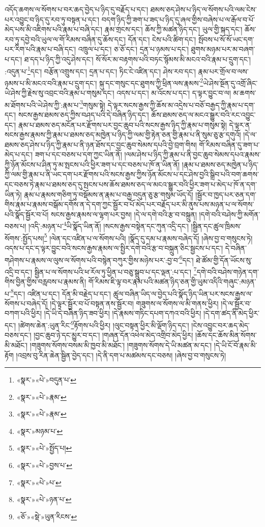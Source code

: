 འདོད་ཆགས་ལ་སོགས་པ་བར་ཆད་བྱེད་པ་ཉིད་དུ་བརྗོད་པ་དང་། ཐམས་ཅད་ཤེས་པ་ཉིད་ལ་སོགས་པའི་ལམ་ངེས་པར་འབྱུང་བ་ཉིད་དུ་རབ་ཏུ་བསྟན་པ་དང་། བདག་ཉིད་ཀྱི་ཟག་པ་ཟད་པ་ཉིད་དུ་ཞལ་གྱིས་བཞེས་པ་ལ་རྒོལ་བ་པོ་མེད་པས་མི་འཇིགས་པའི་རྣམ་པ་བཞི་དང་། རྣམ་གྲངས་དང་། ཆོས་ཀྱི་མཚན་ཉིད་དང་། ཡུལ་གྱི་སྐད་དང་། ཆོས་རབ་ཏུ་དབྱེ་བའི་ཡུལ་ལ་གོ་རིམས་བཞིན་དུ་ཆོས་དང་། དོན་དང་། ངེས་པའི་ཚིག་དང་། སྤོབས་པ་སོ་སོ་ཡང་དག་པར་རིག་པའི་རྣམ་པ་བཞི་དང་། འཁྲུལ་པ་དང་། ཅ་ཅོ་དང་། དྲན་པ་ཉམས་པ་དང་། ཐུགས་མཉམ་པར་མ་བཞག་པ་དང་། ཐ་དད་པ་ཉིད་ཀྱི་འདུ་ཤེས་དང་། སོ་སོར་མ་བརྟགས་པའི་བཏང་སྙོམས་མི་མངའ་བའི་རྣམ་པ་དྲུག་དང་། :འདུན་པ་\footnote{«སྣར་»«པེ་»བདུན་པ་}དང་། བརྩོན་འགྲུས་དང་། དྲན་པ་དང་། ཏིང་ངེ་འཛིན་དང་། ཤེས་རབ་དང་། རྣམ་པར་གྲོལ་བ་ལས་ཉམས་པ་མི་མངའ་བའི་རྣམ་པ་དྲུག་དང་། སྐུ་དང་གསུང་དང་ཐུགས་ཀྱི་ཕྲིན་ལས་རྣམས་\footnote{«སྣར་»«པེ་»རྣམ་}ཡེ་ཤེས་སྔོན་དུ་འགྲོ་ཞིང་ཡེ་ཤེས་ཀྱི་རྗེས་སུ་འབྲང་བའི་རྣམ་པ་གསུམ་དང་། འདས་པ་དང་། མ་འོངས་པ་དང་། ད་ལྟར་བྱུང་བ་ལ། མ་ཆགས་མ་ཐོགས་པའི་ཡེ་ཤེས་ཀྱི་:རྣམ་པ་\footnote{«སྣར་»«པེ་»རྣམ་}གསུམ་སྟེ། དེ་ལྟར་སངས་རྒྱས་ཀྱི་ཆོས་མ་འདྲེས་པ་བཅོ་བརྒྱད་ཀྱི་རྣམ་པ་དག་དང་། སངས་རྒྱས་ཐམས་ཅད་ཀྱིས་བཤད་པའི་དེ་བཞིན་ཉིད་དང་། ཆོས་ཐམས་ཅད་ལ་མངའ་སྒྱུར་བའི་རང་འབྱུང་དང་། རྣམ་པ་ཐམས་ཅད་མངོན་པར་རྫོགས་པར་བྱང་ཆུབ་པའི་སངས་རྒྱས་ཉིད་ཀྱི་རྣམ་པ་གསུམ་སྟེ། དེ་ལྟར་ན་སངས་རྒྱས་རྣམས་ཀྱི་རྣམ་པ་ཐམས་ཅད་མཁྱེན་པ་ཉིད་ཀྱི་ལམ་གྱི་རྟེན་ཅན་གྱི་རྣམ་པ་ནི་སུམ་ཅུ་རྩ་དགུའོ། །དེ་ལ་ཐམས་ཅད་ཤེས་པ་ཉིད་ཀྱི་རྣམ་པ་ནི་ཉན་ཐོས་དང་བྱང་ཆུབ་སེམས་དཔའི་བྱེ་བྲག་གིས། གོ་རིམས་བཞིན་དུ་ཟག་པ་མེད་པ་དང་། ཟག་པ་དང་བཅས་པ་དག་ཀྱང་ཡིན་ནོ། །ལམ་ཤེས་པ་ཉིད་ཀྱི་རྣམ་པ་ནི་བྱང་ཆུབ་སེམས་དཔའ་རྣམས་ཀྱི་ཉོན་མོངས་པ་ཤིན་ཏུ་མ་སྤངས་པའི་ཕྱིར་ཟག་པ་དང་བཅས་པ་ཁོ་ན་ཡིན་ནོ། །རྣམ་པ་ཐམས་ཅད་མཁྱེན་པ་ཉིད་ཀྱི་ལམ་གྱི་རྣམ་པ་ནི་ཡང་དག་པར་རྫོགས་པའི་སངས་རྒྱས་ཀྱིས་ཉོན་མོངས་པ་དང་ཤེས་བྱའི་སྒྲིབ་པའི་བག་ཆགས་དང་བཅས་ཏེ་རྣམ་པ་ཐམས་ཅད་དུ་སྤངས་པས་ཆོས་ཐམས་ཅད་ལ་མངའ་སྒྱུར་བའི་ཕྱིར་ཟག་པ་མེད་པ་ཁོ་ན་དག་ཡིན་ཏེ། རྣམ་པ་རྣམས་གཅིག་ཏུ་བསྡོམས་ན་རྣམ་པ་བརྒྱ་བདུན་ཅུ་རྩ་གསུམ་ཡོད་དོ། །སྦྱོར་བ་ཁྱད་པར་ཅན་དག་གིས་རྣམ་པ་རྣམས་བསྒོམ་དགོས་ན་དེ་དག་ཀྱང་སྦྱོར་བ་པོ་མེད་པར་བརྗོད་པར་མི་ནུས་པས་མཉན་པ་ལ་སོགས་པའི་སྣོད་སྦྱོར་བ་པོ། སངས་རྒྱས་རྣམས་ལ་ལྷག་པར་བྱས། །དེ་ལ་དགེ་བའི་རྩ་བ་བསྐྲུན། །དགེ་བའི་བཤེས་ཀྱི་མགོན་བཅས་པ། །འདི་:མཉན་པ་\footnote{«སྣར་»མཉམ་པ་}ཡི་སྣོད་ཡིན་ནོ། །སངས་རྒྱས་བསྟེན་དང་ཀུན་འདྲི་དང་། །སྦྱིན་དང་ཚུལ་ཁྲིམས་སོགས་:སྤྱོད་པས།\footnote{«སྣར་»«པེ་»སྤྱོད་པ།} །ལེན་དང་འཛིན་པ་ལ་སོགས་པའི། །སྣོད་དུ་དམ་པ་རྣམས་བཞེད་དོ། །ཞེས་བྱ་བ་གསུངས་ཏེ། འདས་པ་དང་ད་ལྟར་བྱུང་བའི་སངས་རྒྱས་རྣམས་ལ་སྤྱིར་དགེ་བའི་རྩ་བ་བསྐྲུན་ཅིང་སྦྱངས་པ་དང་། དེ་བཞིན་གཤེགས་པ་རྣམས་ལ་ལུས་ལ་སོགས་པའི་བསྙེན་བཀུར་གྱིས་མཉེས་པར་:བྱ་བ་\footnote{«སྣར་»«པེ་»བྱས་པ་}དང་། ཐེ་ཚོམ་གྱི་དོན་ཡོངས་སུ་འདྲི་བ་དང་། སྦྱིན་པ་ལ་སོགས་པའི་ཕ་རོལ་ཏུ་ཕྱིན་པ་བཅུ་སྒྲུབ་པ་དང་ལྡན་:པ་དང་། \footnote{«སྣར་»«པེ་»པ་}དགེ་བའི་བཤེས་གཉེན་དག་གིས་བྱིན་གྱིས་བརླབས་པ་རྣམས་ནི། གོ་རིམས་ཇི་ལྟ་བར་རྣམ་པའི་མཚན་ཉིད་ཅན་གྱི་ཡུམ་འདིའི་གཞུང་:མཉན་པ་\footnote{«སྣར་»«པེ་»ཉན་པ་}དང་། འཛིན་པ་དང་། དོན་མི་བརྗེད་པ་དང་། ཚུལ་བཞིན་ཡིད་ལ་བྱེད་པའི་སྣོད་ཉིད་ཡིན་པར་སངས་རྒྱས་ལ་སོགས་པ་བཞེད་དོ། །དེ་ལྟར་སྦྱོར་བ་པོ་བསྟན་ནས་སྦྱོར་བ། གཟུགས་ལ་སོགས་ལ་མི་གནས་ཕྱིར། །དེ་ལ་སྦྱོར་བ་བཀག་པའི་ཕྱིར། །དེ་ཡི་དེ་བཞིན་ཉིད་ཟབ་ཕྱིར། །དེ་རྣམས་གཏིང་དཔག་དཀའ་བའི་ཕྱིར། །དེ་དག་ཚད་ནི་མེད་ཕྱིར་དང་། །ཚེགས་ཆེན་:ཡུན་རིང་\footnote{«ཅོ་»«སྡེ་»ཡུན་རིངས་}རྟོགས་པའི་ཕྱིར། །ལུང་བསྟན་ཕྱིར་མི་ལྡོག་ཉིད་དང་། །ངེས་འབྱུང་བར་ཆད་མེད་བཅས་དང་། །བྱང་ཆུབ་ཉེ་དང་མྱུར་བ་དང་། །གཞན་དོན་འཕེལ་མེད་འགྲིབ་མེད་ཕྱིར། །ཆོས་དང་ཆོས་མིན་སོགས་མི་མཐོང་། །གཟུགས་སོགས་བསམ་མི་ཁྱབ་མི་མཐོང་། །གཟུགས་སོགས་དེ་ཡི་མཚན་མ་དང་། །དེ་ཡི་ངོ་བོ་རྣམ་མི་རྟོག །འབྲས་བུ་རིན་ཆེན་སྦྱིན་བྱེད་དང་། །དེ་ནི་དག་པ་མཚམས་དང་བཅས། །ཞེས་བྱ་བ་གསུངས་ཏེ། 